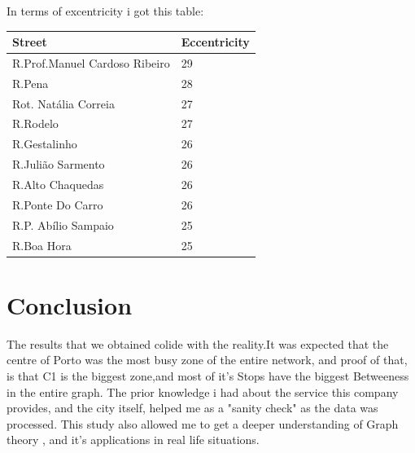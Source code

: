 \documentclass[12pt]{article}
\begin{document}
\begin{multicols}{2}
\begin{center}
\begin{tabular}[h]{|l|r|}
\hline
\end{tabular}
\end{center}

In terms of excentricity i got this table:
\begin{center}
\begin{tabular}[h]{|l|l|}
\hline
Street	& Eccentricity\\
\hline
R.Prof.Manuel Cardoso Ribeiro & 29\\
R.Pena & 28\\
Rot. Natália Correia & 27\\
R.Rodelo & 27\\
R.Gestalinho & 26\\
R.Julião Sarmento &	26\\
R.Alto Chaquedas & 26\\
R.Ponte Do Carro & 26\\
R.P. Abílio Sampaio & 25\\
R.Boa Hora & 25\\
\hline
\end{tabular}
\end{center}

\section{Conclusion}
	The results that we obtained colide with the reality.It was expected that the centre of Porto was the most busy zone of the entire network, and proof of that, is that C1 is the biggest zone,and most of it's Stops have the biggest Betweeness in the entire graph. The prior knowledge i had about the service this company provides, and the city itself, helped me as a "sanity check" as the data was processed. This study also allowed me to get a deeper understanding of Graph theory , and it's applications in real life situations.

	

\end{multicols}	
\end{document}
